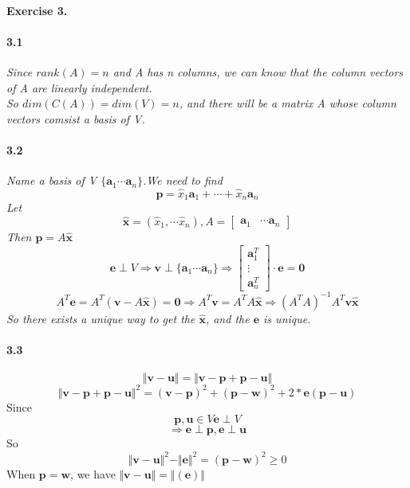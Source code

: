 \documentclass{article}
\begin{document}
\paragraph{Exercise 3.}
    \paragraph{3.1}
        \textit{
            Since $rank(A)=n$ and A has n columns, we can know that the column vectors of A are linearly independent.\\
            So $dim(C(A))=dim(V)=n$, and there will be a matrix A whose column vectors comsist a basis of V.
        }
    \paragraph{3.2}
        \textit{
            Name a basis of V $\{\mathbf{a}_1 \cdots \mathbf{a}_n\}$.We need to find 
            \[
            \mathbf{p}=\hat{x}_1\mathbf{a}_1+\cdots +\hat{x}_n\mathbf{a}_n
            \]
            Let
            \[
            \mathbf{\hat{x}}=(\hat{x}_1,\cdots \hat{x}_n) , A=\begin{bmatrix}
                \mathbf{a}_1 & \cdots \mathbf{a}_n
            \end{bmatrix}
            \]
            Then $\mathbf{p}=A\mathbf{\hat{x}}$
            \[
            \mathbf{e} \perp V \Rightarrow \mathbf{v} \perp \{\mathbf{a}_1\cdots\mathbf{a}_n\} \Rightarrow \begin{bmatrix}
                \mathbf{a}^T_1\\
                \vdots\\
                \mathbf{a}^T_n
            \end{bmatrix}\cdot \mathbf{e} = \mathbf{0}
            \]
            \[
            A^T \mathbf{e} = A^T (\mathbf{v}-A\mathbf{\hat{x}}) = \mathbf{0} \Rightarrow A^T \mathbf{v}= A^TA\mathbf{\hat{x}} \Rightarrow (A^TA)^{-1}A^T\mathbf{v}\mathbf{\hat{x}}
            \]
            So there exists a unique way to get the $\mathbf{\hat{x}}$, and the $\mathbf{e}$ is unique.
        }
    \paragraph{3.3}
        \[
        \Vert \mathbf{v}-\mathbf{u} \Vert = \Vert \mathbf{v}-\mathbf{p}+\mathbf{p}-\mathbf{u} \Vert
        \]
        \[
        \Vert \mathbf{v}-\mathbf{p}+\mathbf{p}-\mathbf{u} \Vert^2 = (\mathbf{v}-\mathbf{p})^2 +(\mathbf{p}-\mathbf{w})^2 + 2*\mathbf{e}(\mathbf{p}-\mathbf{u})
        \]
        Since 
        \[
        \mathbf{p},\mathbf{u} \in V \mathbf{e} \perp V 
        \]
        \[
        \Rightarrow \mathbf{e}\perp \mathbf{p} , \mathbf{e} \perp \mathbf{u}
        \]
        So
        \[
            \Vert \mathbf{v}-\mathbf{u} \Vert^2  - \Vert\mathbf{e}\Vert^2  = (\mathbf{p}-\mathbf{w})^2 \geq 0 
        \]
        When $\mathbf{p}=\mathbf{w}$, we have $\Vert \mathbf{v}-\mathbf{u} \Vert = \Vert (\mathbf{e}) \Vert$
\end{document}
